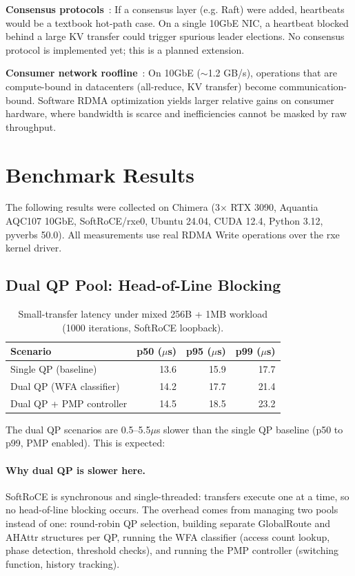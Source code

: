 \documentclass[11pt]{article}
\begin{document}
\textbf{Consensus protocols}~\cite{paxos_raft_zab}: If a consensus layer (e.g. Raft) were added, heartbeats would be a textbook hot-path case. On a single 10GbE NIC, a heartbeat blocked behind a large KV transfer could trigger spurious leader elections. No consensus protocol is implemented yet; this is a planned extension.

\textbf{Consumer network roofline}~\cite{scaling_book}: On 10GbE ($\sim$1.2 GB/s), operations that are compute-bound in datacenters (all-reduce, KV transfer) become communication-bound. Software RDMA optimization yields larger relative gains on consumer hardware, where bandwidth is scarce and inefficiencies cannot be masked by raw throughput.



\section{Benchmark Results}

The following results were collected on Chimera (3$\times$ RTX 3090, Aquantia AQC107 10GbE, SoftRoCE/rxe0, Ubuntu 24.04, CUDA 12.4, Python 3.12, pyverbs 50.0). All measurements use real RDMA Write operations over the rxe kernel driver.

\subsection{Dual QP Pool: Head-of-Line Blocking}

\begin{table}[h]
\centering
\caption{Small-transfer latency under mixed 256B + 1MB workload (1000 iterations, SoftRoCE loopback).}
\label{tab:dual_qp_results}
\begin{tabular}{lrrr}
\toprule
Scenario & p50 ($\mu$s) & p95 ($\mu$s) & p99 ($\mu$s) \\
\midrule
Single QP (baseline) & 13.6 & 15.9 & 17.7 \\
Dual QP (WFA classifier) & 14.2 & 17.7 & 21.4 \\
Dual QP + PMP controller & 14.5 & 18.5 & 23.2 \\
\bottomrule
\end{tabular}
\end{table}

The dual QP scenarios are 0.5--5.5$\mu$s slower than the single QP baseline (p50 to p99, PMP enabled). This is expected:

\paragraph{Why dual QP is slower here.} SoftRoCE is synchronous and single-threaded: transfers execute one at a time, so no head-of-line blocking occurs. The overhead comes from managing two pools instead of one: round-robin QP selection, building separate GlobalRoute and AHAttr structures per QP, running the WFA classifier (access count lookup, phase detection, threshold checks), and running the PMP controller (switching function, history tracking).
\end{document}
